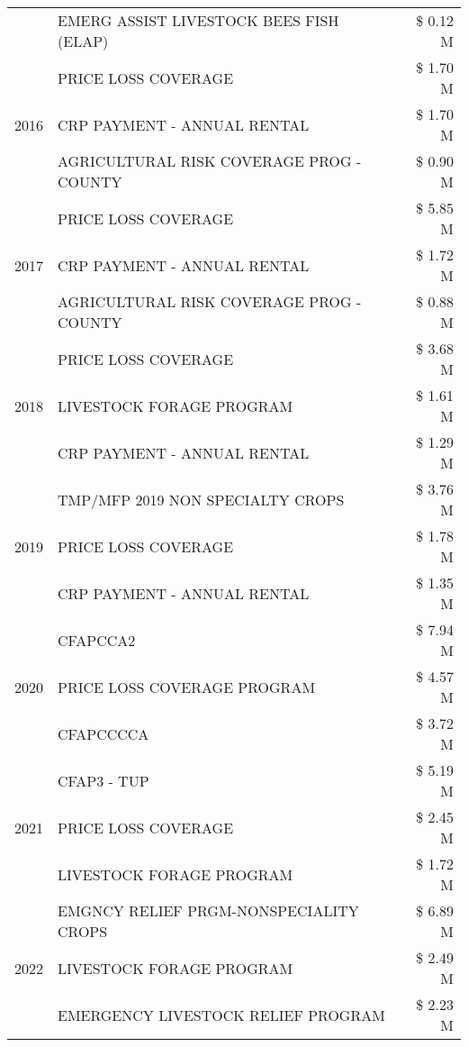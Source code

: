 \begin{tabular}{llr}
 & EMERG ASSIST LIVESTOCK BEES FISH (ELAP) & \$ 0.12 M \\
\cline{1-3}
\multirow[t]{3}{*}{2016} & PRICE LOSS COVERAGE & \$ 1.70 M \\
 & CRP PAYMENT - ANNUAL RENTAL & \$ 1.70 M \\
 & AGRICULTURAL RISK COVERAGE PROG - COUNTY & \$ 0.90 M \\
\cline{1-3}
\multirow[t]{3}{*}{2017} & PRICE LOSS COVERAGE & \$ 5.85 M \\
 & CRP PAYMENT - ANNUAL RENTAL & \$ 1.72 M \\
 & AGRICULTURAL RISK COVERAGE PROG - COUNTY & \$ 0.88 M \\
\cline{1-3}
\multirow[t]{3}{*}{2018} & PRICE LOSS COVERAGE & \$ 3.68 M \\
 & LIVESTOCK FORAGE PROGRAM & \$ 1.61 M \\
 & CRP PAYMENT - ANNUAL RENTAL & \$ 1.29 M \\
\cline{1-3}
\multirow[t]{3}{*}{2019} & TMP/MFP 2019 NON SPECIALTY CROPS & \$ 3.76 M \\
 & PRICE LOSS COVERAGE & \$ 1.78 M \\
 & CRP PAYMENT - ANNUAL RENTAL & \$ 1.35 M \\
\cline{1-3}
\multirow[t]{3}{*}{2020} & CFAPCCA2 & \$ 7.94 M \\
 & PRICE LOSS COVERAGE PROGRAM & \$ 4.57 M \\
 & CFAPCCCCA & \$ 3.72 M \\
\cline{1-3}
\multirow[t]{3}{*}{2021} & CFAP3 - TUP & \$ 5.19 M \\
 & PRICE LOSS COVERAGE & \$ 2.45 M \\
 & LIVESTOCK FORAGE PROGRAM & \$ 1.72 M \\
\cline{1-3}
\multirow[t]{3}{*}{2022} & EMGNCY RELIEF PRGM-NONSPECIALITY CROPS & \$ 6.89 M \\
 & LIVESTOCK FORAGE PROGRAM & \$ 2.49 M \\
 & EMERGENCY LIVESTOCK RELIEF PROGRAM & \$ 2.23 M \\
\cline{1-3}
\bottomrule
\end{tabular}
